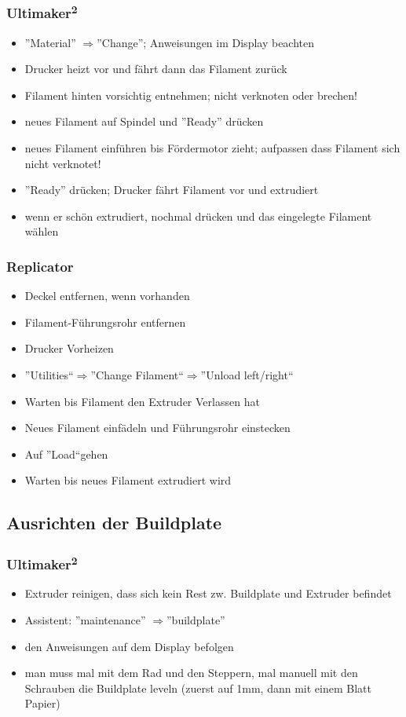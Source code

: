 \documentclass{\basedir/fablab-document}
\newcommand{\ts}[1]{\textsuperscript{#1}}
\newcommand{\ra}{$\Rightarrow$}
\begin{document}
\subsubsection{Ultimaker\ts2}
\begin{itemize}
    \item ''Material'' \ra ''Change''; Anweisungen im Display beachten
    \item Drucker heizt vor und fährt dann das Filament zurück
    \item Filament hinten vorsichtig entnehmen; nicht verknoten oder brechen!
    \item neues Filament auf Spindel und ''Ready'' drücken
    \item neues Filament einführen bis Fördermotor zieht; aufpassen dass Filament sich nicht verknotet!
    \item ''Ready'' drücken; Drucker fährt Filament vor und extrudiert
    \item wenn er schön extrudiert, nochmal drücken und das eingelegte Filament wählen
\end{itemize}

\subsubsection{Replicator}
\begin{itemize}
	\item Deckel entfernen, wenn vorhanden
	\item Filament-Führungsrohr entfernen
	\item Drucker Vorheizen
	\item ''Utilities``\ra ''Change Filament``\ra ''Unload left/right``
	\item Warten bis Filament den Extruder Verlassen hat 
	\item Neues Filament einfädeln und Führungsrohr einstecken
	\item Auf ''Load``gehen
	\item Warten bis neues Filament extrudiert wird
\end{itemize}

\subsection{Ausrichten der Buildplate}

\subsubsection{Ultimaker\ts2}
\begin{itemize}
\item Extruder reinigen, dass sich kein Rest zw. Buildplate und Extruder befindet
\item Assistent: ''maintenance'' \ra ''buildplate''
\item den Anweisungen auf dem Display befolgen
\item man muss mal mit dem Rad und den Steppern, mal manuell mit den Schrauben die Buildplate leveln (zuerst auf 1mm, dann mit einem Blatt Papier)
\end{itemize}
\end{document}
